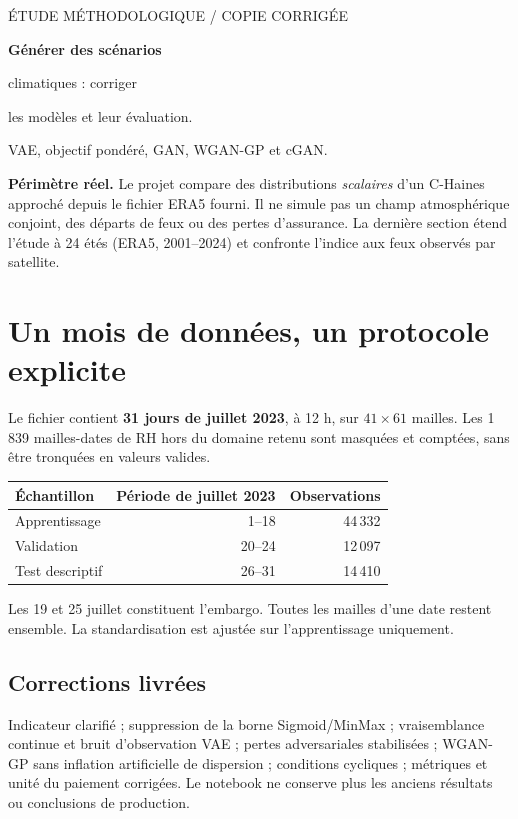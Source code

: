 \documentclass[11pt,a4paper]{article}
\begin{document}
{\small\color{Muted}ÉTUDE MÉTHODOLOGIQUE / COPIE CORRIGÉE}
\vspace{5mm}

{\fontsize{26}{30}\selectfont\bfseries\color{Forest}Générer des scénarios\par climatiques : corriger\par les modèles et leur évaluation.}

{\large VAE, objectif pondéré, GAN, WGAN-GP et cGAN.}
\vspace{3mm}
\begin{keybox}
\textbf{Périmètre réel.} Le projet compare des distributions \emph{scalaires} d'un C-Haines approché depuis le fichier ERA5 fourni. Il ne simule pas un champ atmosphérique conjoint, des départs de feux ou des pertes d'assurance. La dernière section étend l'étude à 24 étés (ERA5, 2001--2024) et confronte l'indice aux feux observés par satellite.
\end{keybox}

\section*{Un mois de données, un protocole explicite}
Le fichier contient \textbf{31 jours de juillet 2023}, à 12 h, sur $41\times61$ mailles. Les 1\,839 mailles-dates de RH hors du domaine retenu sont masquées et comptées, sans être tronquées en valeurs valides.

\begin{center}
\begin{tabular}{lrr}
\toprule
Échantillon & Période de juillet 2023 & Observations \\
\midrule
Apprentissage & 1--18 & 44\,332 \\
Validation & 20--24 & 12\,097 \\
Test descriptif & 26--31 & 14\,410 \\
\bottomrule
\end{tabular}
\end{center}
Les 19 et 25 juillet constituent l'embargo. Toutes les mailles d'une date restent ensemble. La standardisation est ajustée sur l'apprentissage uniquement.

\subsection*{Corrections livrées}
Indicateur clarifié ; suppression de la borne Sigmoid/MinMax ; vraisemblance continue et bruit d'observation VAE ; pertes adversariales stabilisées ; WGAN-GP sans inflation artificielle de dispersion ; conditions cycliques ; métriques et unité du paiement corrigées. Le notebook ne conserve plus les anciens résultats ou conclusions de production.
\end{document}
